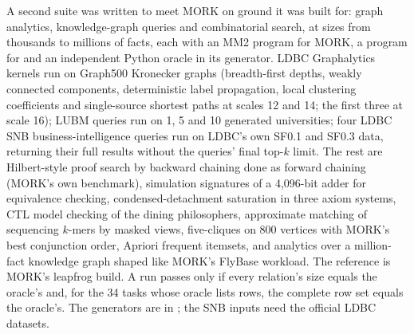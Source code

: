 A second suite was written to meet MORK on ground it was built for: graph
analytics, knowledge-graph queries and combinatorial search, at sizes from
thousands to millions of facts, each with an MM2 program for MORK, a
\PeTTa{} program for \CeTTa{} and an independent Python oracle in its
generator.  LDBC Graphalytics kernels run on Graph500 Kronecker graphs
(breadth-first depths, weakly connected components, deterministic label
propagation, local clustering coefficients and single-source shortest paths at
scales 12 and 14; the first three at scale 16); LUBM queries run on 1, 5 and 10
generated universities; four LDBC SNB business-intelligence queries run on
LDBC's own SF0.1 and SF0.3 data, returning their full results without the
queries' final top-$k$ limit.  The rest are Hilbert-style proof search by
backward chaining done as forward chaining (MORK's own  benchmark),
simulation signatures of a 4,096-bit adder for equivalence checking,
condensed-detachment saturation in three axiom systems, CTL model checking of
the dining philosophers, approximate matching of sequencing $k$-mers by masked
views, five-cliques on 800 vertices with MORK's best conjunction order, Apriori
frequent itemsets, and analytics over a million-fact knowledge graph shaped like
MORK's FlyBase workload.  The reference is MORK's leapfrog build.  A run
passes only if every relation's size equals the oracle's and, for the 34 tasks
whose oracle lists rows, the complete row set equals the oracle's.  The
generators are in ; the SNB inputs need the
official LDBC datasets.

